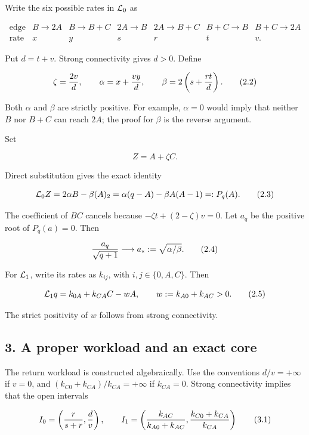 Write the six possible rates in \({\cal L}_0\) as

\[
\begin{array}{c|cccccc}
\text{edge}&B\to2A&B\to B+C&2A\to B&2A\to B+C&B+C\to B&B+C\to2A\\
\hline
\text{rate}&x&y&s&r&t&v .
\end{array}                                                  \tag{2.1}
\]

Put \(d=t+v\). Strong connectivity gives \(d>0\). Define

\[
 \zeta={2v\over d},\qquad
 \alpha=x+{vy\over d},\qquad
 \beta=2\left(s+{rt\over d}\right).                        \tag{2.2}
\]

Both \(\alpha\) and \(\beta\) are strictly positive. For example,
\(\alpha=0\) would imply that neither \(B\) nor \(B+C\) can reach
\(2A\); the proof for \(\beta\) is the reverse argument.

Set

\[
 Z=A+\zeta C.
\]

Direct substitution gives the exact identity

\[
 {\cal L}_0Z
 =2\alpha B-\beta(A)_2
 =\alpha(q-A)-\beta A(A-1)=:P_q(A).                         \tag{2.3}
\]

The coefficient of \(BC\) cancels because \(-\zeta t+(2-\zeta)v=0\). Let
\(a_q\) be the positive root of \(P_q(a)=0\). Then

\[
 {a_q\over\sqrt{q+1}}\longrightarrow
 a_*:=\sqrt{\alpha/\beta}.                                 \tag{2.4}
\]

For \({\cal L}_1\), write its rates as \(k_{ij}\), with
\(i,j\in\{0,A,C\}\). Then

\[
 {\cal L}_1q=k_{0A}+k_{CA}C-wA,\qquad
 w:=k_{A0}+k_{AC}>0.                                       \tag{2.5}
\]

The strict positivity of \(w\) follows from strong connectivity.

\subsection{3. A proper workload and an exact
core}

The return workload is constructed algebraically. Use the conventions
\(d/v=+\infty\) if \(v=0\), and \((k_{C0}+k_{CA})/k_{CA}=+\infty\) if
\(k_{CA}=0\). Strong connectivity implies that the open intervals

\[
 I_0=\left({r\over s+r},{d\over v}\right),\qquad
 I_1=\left({k_{AC}\over k_{A0}+k_{AC}},
            {k_{C0}+k_{CA}\over k_{CA}}\right)             \tag{3.1}
\]

